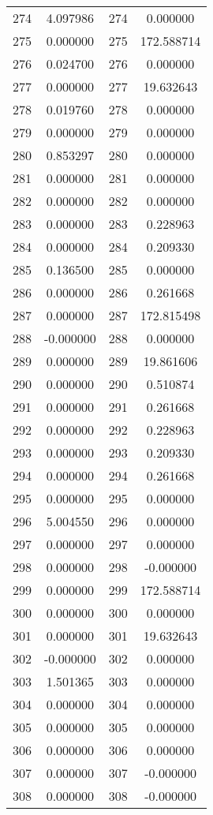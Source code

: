 \documentclass[12pt]{article}
\begin{document}
\begin{longtable}{@{}cccc@{}}
274 & 4.097986 & 274 & 0.000000 \\
275 & 0.000000 & 275 & 172.588714 \\
276 & 0.024700 & 276 & 0.000000 \\
277 & 0.000000 & 277 & 19.632643 \\
278 & 0.019760 & 278 & 0.000000 \\
279 & 0.000000 & 279 & 0.000000 \\
280 & 0.853297 & 280 & 0.000000 \\
281 & 0.000000 & 281 & 0.000000 \\
282 & 0.000000 & 282 & 0.000000 \\
283 & 0.000000 & 283 & 0.228963 \\
284 & 0.000000 & 284 & 0.209330 \\
285 & 0.136500 & 285 & 0.000000 \\
286 & 0.000000 & 286 & 0.261668 \\
287 & 0.000000 & 287 & 172.815498 \\
288 & -0.000000 & 288 & 0.000000 \\
289 & 0.000000 & 289 & 19.861606 \\
290 & 0.000000 & 290 & 0.510874 \\
291 & 0.000000 & 291 & 0.261668 \\
292 & 0.000000 & 292 & 0.228963 \\
293 & 0.000000 & 293 & 0.209330 \\
294 & 0.000000 & 294 & 0.261668 \\
295 & 0.000000 & 295 & 0.000000 \\
296 & 5.004550 & 296 & 0.000000 \\
297 & 0.000000 & 297 & 0.000000 \\
298 & 0.000000 & 298 & -0.000000 \\
299 & 0.000000 & 299 & 172.588714 \\
300 & 0.000000 & 300 & 0.000000 \\
301 & 0.000000 & 301 & 19.632643 \\
302 & -0.000000 & 302 & 0.000000 \\
303 & 1.501365 & 303 & 0.000000 \\
304 & 0.000000 & 304 & 0.000000 \\
305 & 0.000000 & 305 & 0.000000 \\
306 & 0.000000 & 306 & 0.000000 \\
307 & 0.000000 & 307 & -0.000000 \\
308 & 0.000000 & 308 & -0.000000 \\

\end{longtable}
\end{document}
